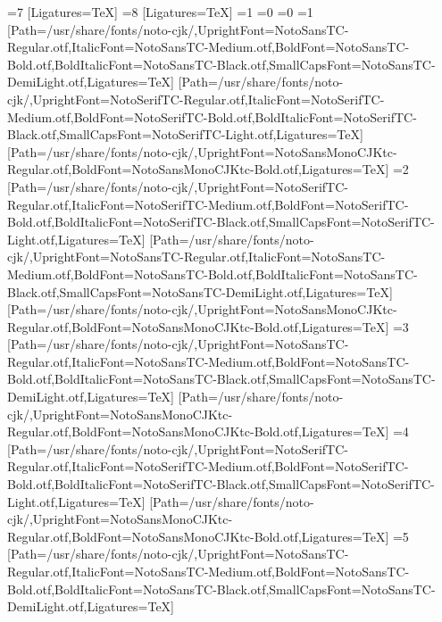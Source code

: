 \else\ifnum\value{Fonts}=7
\setmainfont{TeX Gyre Heros}[Ligatures=TeX]
\else\ifnum\value{Fonts}=8
\setmainfont{TeX Gyre Termes}[Ligatures=TeX]
\fi\fi\fi\fi\fi\fi\fi\fi
\ifnum\value{CJK}=1
\ifx\luatexversion\undefined
\ifnum\value{CJKFonts}=0\else
\ifnum\value{CJKLanguage}=0
\ifnum\value{CJKFonts}=1
[Path=/usr/share/fonts/noto-cjk/,UprightFont=NotoSansTC-Regular.otf,ItalicFont=NotoSansTC-Medium.otf,BoldFont=NotoSansTC-Bold.otf,BoldItalicFont=NotoSansTC-Black.otf,SmallCapsFont=NotoSansTC-DemiLight.otf,Ligatures=TeX]
[Path=/usr/share/fonts/noto-cjk/,UprightFont=NotoSerifTC-Regular.otf,ItalicFont=NotoSerifTC-Medium.otf,BoldFont=NotoSerifTC-Bold.otf,BoldItalicFont=NotoSerifTC-Black.otf,SmallCapsFont=NotoSerifTC-Light.otf,Ligatures=TeX]
[Path=/usr/share/fonts/noto-cjk/,UprightFont=NotoSansMonoCJKtc-Regular.otf,BoldFont=NotoSansMonoCJKtc-Bold.otf,Ligatures=TeX]
\else\ifnum\value{CJKFonts}=2
[Path=/usr/share/fonts/noto-cjk/,UprightFont=NotoSerifTC-Regular.otf,ItalicFont=NotoSerifTC-Medium.otf,BoldFont=NotoSerifTC-Bold.otf,BoldItalicFont=NotoSerifTC-Black.otf,SmallCapsFont=NotoSerifTC-Light.otf,Ligatures=TeX]
[Path=/usr/share/fonts/noto-cjk/,UprightFont=NotoSansTC-Regular.otf,ItalicFont=NotoSansTC-Medium.otf,BoldFont=NotoSansTC-Bold.otf,BoldItalicFont=NotoSansTC-Black.otf,SmallCapsFont=NotoSansTC-DemiLight.otf,Ligatures=TeX]
[Path=/usr/share/fonts/noto-cjk/,UprightFont=NotoSansMonoCJKtc-Regular.otf,BoldFont=NotoSansMonoCJKtc-Bold.otf,Ligatures=TeX]
\else\ifnum\value{CJKFonts}=3
[Path=/usr/share/fonts/noto-cjk/,UprightFont=NotoSansTC-Regular.otf,ItalicFont=NotoSansTC-Medium.otf,BoldFont=NotoSansTC-Bold.otf,BoldItalicFont=NotoSansTC-Black.otf,SmallCapsFont=NotoSansTC-DemiLight.otf,Ligatures=TeX]
[Path=/usr/share/fonts/noto-cjk/,UprightFont=NotoSansMonoCJKtc-Regular.otf,BoldFont=NotoSansMonoCJKtc-Bold.otf,Ligatures=TeX]
\else\ifnum\value{CJKFonts}=4
[Path=/usr/share/fonts/noto-cjk/,UprightFont=NotoSerifTC-Regular.otf,ItalicFont=NotoSerifTC-Medium.otf,BoldFont=NotoSerifTC-Bold.otf,BoldItalicFont=NotoSerifTC-Black.otf,SmallCapsFont=NotoSerifTC-Light.otf,Ligatures=TeX]
[Path=/usr/share/fonts/noto-cjk/,UprightFont=NotoSansMonoCJKtc-Regular.otf,BoldFont=NotoSansMonoCJKtc-Bold.otf,Ligatures=TeX]
\else\ifnum\value{CJKFonts}=5
[Path=/usr/share/fonts/noto-cjk/,UprightFont=NotoSansTC-Regular.otf,ItalicFont=NotoSansTC-Medium.otf,BoldFont=NotoSansTC-Bold.otf,BoldItalicFont=NotoSansTC-Black.otf,SmallCapsFont=NotoSansTC-DemiLight.otf,Ligatures=TeX]
